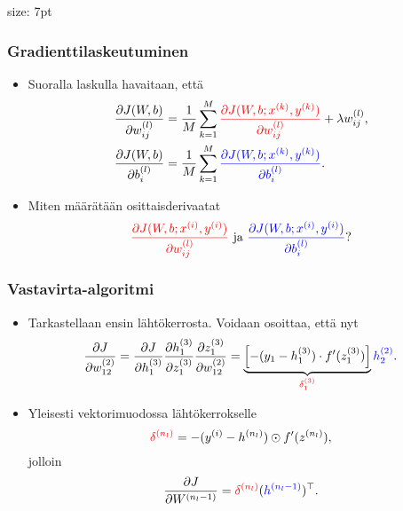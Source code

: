 \documentclass{beamer} %
\theoremstyle{definition}
\begin{document}
\begin{frame}{}{size: 7pt}\frametitle{Gradienttilaskeutuminen}
\begin{itemize}
    \item Suoralla laskulla havaitaan, että \begin{align*}
    &\frac{\partial J(W, b)}{\partial w_{ij}^{(l)}}=\frac{1}{M} \sum_{k=1}^{M} \textcolor{red}{\frac{\partial J(W, b; x^{(k)}, y^{(k)})}{\partial w_{ij}^{(l)}}}+\lambda w_{ij}^{(l)},\\
    &\frac{\partial J(W, b)}{\partial b_{i}^{(l)}}=\frac{1}{M} \sum_{k=1}^{M} \textcolor{blue}{\frac{\partial J(W, b; x^{(k)}, y^{(k)})}{\partial b_{i}^{(l)}}}.
\end{align*}
    
    \item Miten määrätään osittaisderivaatat \[\textcolor{red}{\frac{\partial J(W, b; x^{(i)}, y^{(i)})}{\partial w_{ij}^{(l)}}}\text{ ja }\textcolor{blue}{\frac{\partial J(W, b; x^{(i)}, y^{(i)})}{\partial b_{i}^{(l)}}}?\]
\end{itemize}
\end{frame}

\begin{frame}\frametitle{Vastavirta-algoritmi}
\begin{itemize}
\item Tarkastellaan ensin lähtökerrosta. Voidaan osoittaa, että nyt \[\frac{\partial J}{\partial w_{12}^{(2)}}=\frac{\partial J}{\partial h_1^{(3)}} \frac{\partial h_1^{(3)}}{\partial z_1^{(3)}} \frac{\partial z_1^{(3)}}{\partial w_{12}^{(2)}}=\underbrace{\left[-(y_1-h_1^{(3)})\cdot f'(z_1^{(3)})\right]}_{\textcolor{red}{\delta_1^{(3)}}}\textcolor{blue}{h_2^{(2)}}.\]

\item Yleisesti vektorimuodossa lähtökerrokselle \[\textcolor{red}{\delta^{(n_l)}}=-(y^{(i)}-h^{(n_l)})\odot f'(z^{(n_l)}),\] jolloin \[\frac{\partial J}{\partial W^{(n_l-1)}}=\textcolor{red}{\delta^{(n_l)}} (\textcolor{blue}{h^{(n_l-1)}})^{\top}.\]
\end{itemize}




\end{frame}
\end{document}
